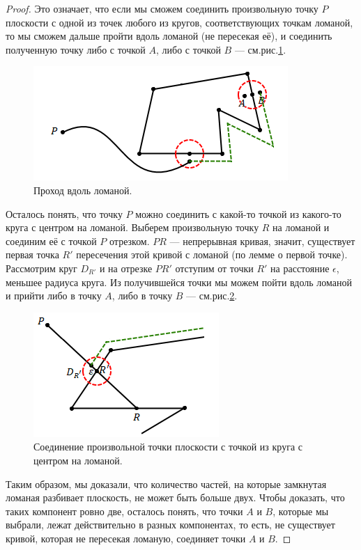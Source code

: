 \begin{proof}
    Это означает, что если мы сможем соединить произвольную точку $P$ плоскости с одной из точек любого из кругов, соответствующих точкам ломаной, то мы сможем дальше пройти вдоль ломаной (не пересекая её), и соединить полученную точку либо с точкой $A$, либо с точкой $B$ — см.рис.\ref{fig:c4.3}.

    \begin{figure}[h]
        \centering
        \includegraphics{images/c4.3.png}
        \caption{Проход вдоль ломаной.}
        \label{fig:c4.3}
    \end{figure}

    Осталось понять, что точку $P$ можно соединить с какой-то точкой из какого-то круга с центром на ломаной.
    Выберем произвольную точку $R$ на ломаной и соединим её с точкой $P$ отрезком. $PR$ — непрерывная кривая, значит, существует первая точка $R'$ пересечения этой кривой с ломаной (по лемме о первой точке). Рассмотрим круг $D_{R'}$ и на отрезке $PR'$ отступим от точки $R'$ на расстояние $\epsilon$, меньшее радиуса круга. Из получившейся точки мы можем пойти вдоль ломаной и прийти либо в точку $A$, либо в точку $B$ — см.рис.\ref{fig:c4.4}.

    \begin{figure}[h]
        \centering
        \includegraphics{images/c4.4.png}
        \caption{Соединение произвольной точки плоскости с точкой из круга с центром на ломаной.}
        \label{fig:c4.4}
    \end{figure}

    Таким образом, мы доказали, что количество частей, на которые замкнутая ломаная разбивает плоскость, не может быть больше двух. Чтобы доказать, что таких компонент ровно две, осталось понять, что точки $A$ и $B$, которые мы выбрали, лежат действительно в разных компонентах, то есть, не существует кривой, которая не пересекая ломаную, соединяет точки $A$ и $B$.


\end{proof}
